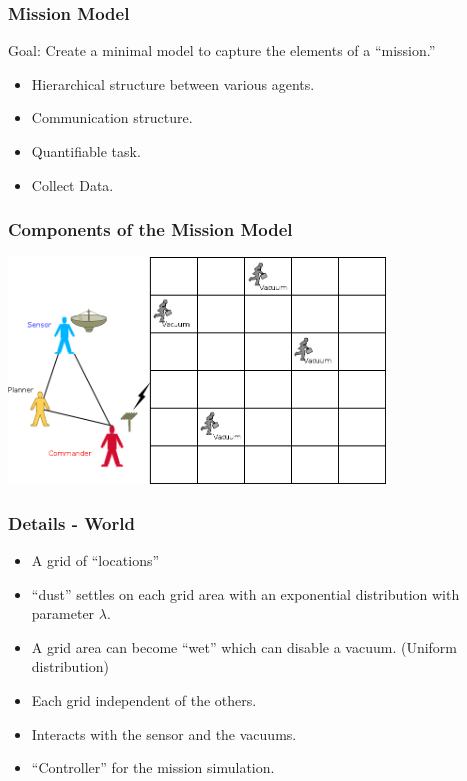 \documentclass{beamer}
\begin{document}
\begin{frame}
  \frametitle{Mission Model}

  Goal: Create a minimal model to capture the elements of a
  ``mission.''

  \begin{itemize}
  \item Hierarchical structure between various agents.
  \item Communication structure.
  \item Quantifiable task.
  \item Collect Data.
  \end{itemize}

\end{frame}

\begin{frame}
  \frametitle{Components of the Mission Model}

  \includegraphics[height=6cm]{conceptualWorld.png}

\end{frame}



\begin{frame}
  \frametitle{Details - World}

  \begin{itemize}
  \item A grid of ``locations''
  \item ``dust'' settles on each grid area with an exponential distribution
    with parameter $\lambda$.
  \item A grid area can become ``wet'' which can disable a
    vacuum. (Uniform distribution)
  \item Each grid independent of the others.
  \item Interacts with the sensor and the vacuums.
  \item ``Controller'' for the mission simulation.
  \end{itemize}
  
\end{frame}
\end{document}
